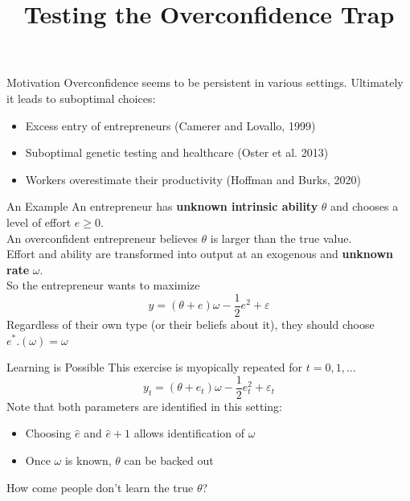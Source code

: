 \documentclass[aspectratio=169]{beamer}
\title{Testing the Overconfidence Trap}
\begin{document}
\frame{\titlepage}

\begin{frame}{Motivation}
    Overconfidence seems to be persistent in various settings. Ultimately it leads to suboptimal choices:
    \begin{itemize} 
        \item Excess entry of entrepreneurs (Camerer and Lovallo, 1999)
        \item Suboptimal genetic testing and healthcare (Oster et al. 2013)
        \item  Workers overestimate their productivity (Hoffman and Burks, 2020)
    \end{itemize}
    \bigskip
    
\end{frame}

\begin{frame}{An Example}
    An entrepreneur has \textbf{unknown intrinsic ability} $\theta$ and chooses a level of effort $e\geq 0.$ \\
    \bigskip
    An overconfident entrepreneur believes $\theta$ is larger than the true value.\\
    \bigskip
    Effort and ability are transformed into output at an exogenous and \textbf{unknown rate} $\omega.$\\
    \bigskip 
    So the entrepreneur wants to maximize \\
        $$y = (\theta + e)\omega-\frac{1}{2}e^2 +\varepsilon$$
    \pause
    Regardless of their own type (or their beliefs about it), they should choose $e^*.(\omega)=\omega$\\
\end{frame}

\begin{frame}{Learning is Possible}
    This exercise is myopically repeated for $t=0, 1, ...$
        $$y_t = (\theta + e_t)\omega-\frac{1}{2}e_t^2 +\varepsilon_t$$
    Note that both parameters are identified in this setting:\\
    \bigskip
    \begin{itemize}
        \item Choosing $\hat{e}$ and $\hat{e}+1$ allows identification of $\omega$\\
        \bigskip
        \item Once $\omega$ is known, $\theta$ can be backed out\\
     \end{itemize}
    \bigskip
    How come people don't learn the true $\theta$?
\end{frame}
\end{document}
